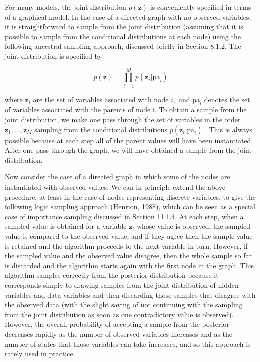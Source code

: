\documentclass[
  10
]{article}
\begin{document}
For many models, the joint distribution \(p ( \mathbf { z } )\) is
conveniently specified in terms of a graphical model. In the case of a
directed graph with no observed variables, it is straightforward to
sample from the joint distribution (assuming that it is possible to
sample from the conditional distributions at each node) using the
following ancestral sampling approach, discussed briefly in Section
8.1.2. The joint distribution is specified by

\[
p (\mathbf {z}) = \prod_ {i = 1} ^ {M} p (\mathbf {z} _ {i} | \mathrm{pa} _ {i})\tag{11.4}
\]

where \(\mathbf { z } _ { i }\) are the set of variables associated with
node \(i ,\) and \(\mathrm { p a } _ { i }\) denotes the set of
variables associated with the parents of node i. To obtain a sample from
the joint distribution, we make one pass through the set of variables in
the order \(\mathbf { z } _ { 1 } , \ldots , \mathbf { z } _ { M }\)
sampling from the conditional distributions
\(p ( \mathbf { z } _ { i } | \mathrm { p a } _ { i } )\) . This is
always possible because at each step all of the parent values will have
been instantiated. After one pass through the graph, we will have
obtained a sample from the joint distribution.

Now consider the case of a directed graph in which some of the nodes are
instantiated with observed values. We can in principle extend the above
procedure, at least in the case of nodes representing discrete
variables, to give the following logic sampling approach (Henrion,
1988), which can be seen as a special case of importance sampling
discussed in Section 11.1.4. At each step, when a sampled value is
obtained for a variable \(\mathbf { z } _ { i }\) whose value is
observed, the sampled value is compared to the observed value, and if
they agree then the sample value is retained and the algorithm proceeds
to the next variable in turn. However, if the sampled value and the
observed value disagree, then the whole sample so far is discarded and
the algorithm starts again with the first node in the graph. This
algorithm samples correctly from the posterior distribution because it
corresponds simply to drawing samples from the joint distribution of
hidden variables and data variables and then discarding those samples
that disagree with the observed data (with the slight saving of not
continuing with the sampling from the joint distribution as soon as one
contradictory value is observed). However, the overall probability of
accepting a sample from the posterior decreases rapidly as the number of
observed variables increases and as the number of states that those
variables can take increases, and so this approach is rarely used in
practice.
\end{document}
